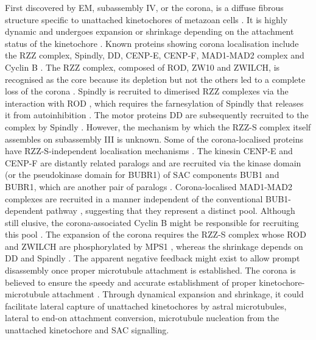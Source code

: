 First discovered by EM, subassembly IV, or the corona, is a diffuse fibrous structure specific to unattached kinetochores of metazoan cells \citep{Jokelainen1967TheCells}. It is highly dynamic and undergoes expansion or shrinkage depending on the attachment status of the kinetochore \citep{Kops2020CrowningSegregation}. Known proteins showing corona localisation include the RZZ complex, Spindly, DD, CENP-E, CENP-F, MAD1-MAD2 complex and Cyclin B \citep{McAinsh2022TheKinetochores}. The RZZ complex, composed of ROD, ZW10 and ZWILCH, is recognised as the core because its depletion but not the others led to a complete loss of the corona \citep{Rodriguez-Rodriguez2018DistinctExpansion, Kops2005ZW10Kinetochore, Silio2015KNL1-BubsKinetochores, Varma2013SpindleKinetochores, Auckland2020CENP-FCargoes, Currie2018Bub1Cells}. Spindly is recruited to dimerised RZZ complexes via the interaction with ROD \citep{Mosalaganti2017StructureSpindly, Pereira2018Self-AssemblyAttachment, Raisch2022StructureKinetochores}, which requires the farnesylation of Spindly that releases it from autoinhibition \citep{Sacristan2018DynamicMitosis}. The motor proteins DD are subsequently recruited to the complex by Spindly \citep{Mosalaganti2017StructureSpindly}. However, the mechanism by which the RZZ-S complex itself assembles on subassembly III is unknown. Some of the corona-localised proteins have RZZ-S-independent localisation mechanisms \citep{Ciossani2018TheKinases, Rodriguez-Rodriguez2018DistinctExpansion}. The kinesin CENP-E and CENP-F are distantly related paralogs and are recruited via the kinase domain (or the pseudokinase domain for BUBR1) of SAC components BUB1 and BUBR1, which are another pair of paralogs \citep{Ciossani2018TheKinases, Berto2018DisentanglingKinetochores}. Corona-localised MAD1-MAD2 complexes are recruited in a manner independent of the conventional BUB1-dependent pathway \citep{Pereira2018Self-AssemblyAttachment}, suggesting that they represent a distinct pool. Although still elusive, the corona-associated Cyclin B might be responsible for recruiting this pool \citep{Allan2020CyclinCheckpoint}. The expansion of the corona requires the RZZ-S complex whose ROD and ZWILCH are phosphorylated by MPS1 \citep{Rodriguez-Rodriguez2018DistinctExpansion, Sacristan2018DynamicMitosis, Pereira2018Self-AssemblyAttachment}, whereas the shrinkage depends on DD and Spindly \citep{Sacristan2018DynamicMitosis, Gassmann2010RemovalCells, Howell2001CytoplasmicInactivation}. The apparent negative feedback might exist to allow prompt disassembly once proper microtubule attachment is established. The corona is believed to ensure the speedy and accurate establishment of proper kinetochore-microtubule attachment \citep{Kops2020CrowningSegregation}. Through dynamical expansion and shrinkage, it could facilitate lateral capture of unattached kinetochores by astral microtubules, lateral to end-on attachment conversion, microtubule nucleation from the unattached kinetochore and SAC signalling. 

